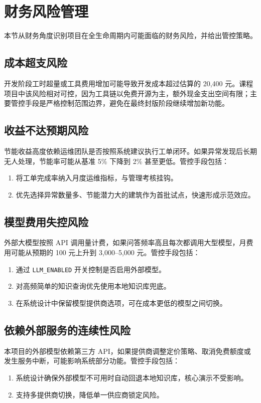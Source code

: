 \documentclass[12pt,a4paper]{ctexart}
\newcommand{\code}[1]{{\footnotesize\nolinkurl{#1}}}
\begin{document}
\section{财务风险管理}

本节从财务角度识别项目在全生命周期内可能面临的财务风险，并给出管控策略。

\subsection{成本超支风险}
开发阶段工时超量或工具费用增加可能导致开发成本超过估算的 20,400 元。课程项目中该风险相对可控，因为工具链以免费开源为主，额外现金支出空间有限；主要管控手段是严格控制范围边界，避免在最终封版阶段继续增加新功能。

\subsection{收益不达预期风险}
节能收益高度依赖运维团队是否按照系统建议执行工单闭环。如果异常发现后长期无人处理，节能率可能从基准 5\% 下降到 2\% 甚至更低。管控手段包括：
\begin{enumerate}
    \item 将工单完成率纳入月度运维指标，与管理考核挂钩。
    \item 优先选择异常数量多、节能潜力大的建筑作为首批试点，快速形成示范效应。
\end{enumerate}

\subsection{模型费用失控风险}
外部大模型按照 API 调用量计费，如果问答频率高且每次都调用大型模型，月费用可能从预期的 100 元上升到 3,000--5,000 元。管控手段包括：
\begin{enumerate}
    \item 通过 \code{LLM_ENABLED} 开关控制是否启用外部模型。
    \item 对高频简单的知识查询优先使用本地知识库兜底。
    \item 在系统设计中保留模型提供商选项，可在成本更低的模型之间切换。
\end{enumerate}

\subsection{依赖外部服务的连续性风险}
本项目的外部模型依赖第三方 API，如果提供商调整定价策略、取消免费额度或发生服务中断，可能影响系统部分功能。管控手段包括：
\begin{enumerate}
    \item 系统设计确保外部模型不可用时自动回退本地知识库，核心演示不受影响。
    \item 支持多提供商切换，降低单一供应商锁定风险。
\end{enumerate}
\end{document}
